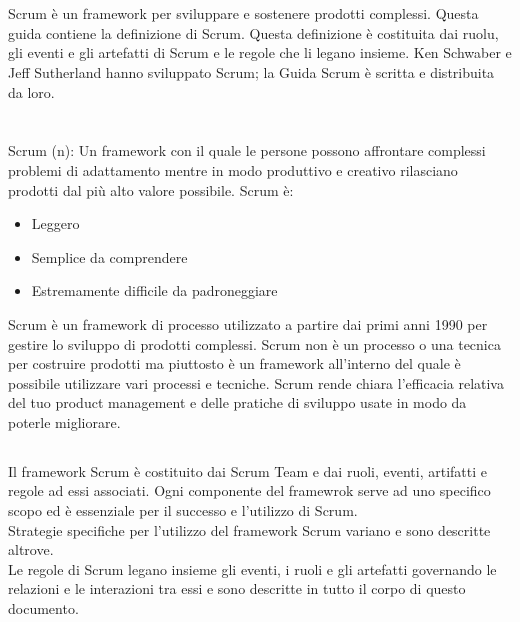 
\section*{\color{Blue}{Scopo della Guida Scrum}}
\label{sec:purpose}
Scrum \`e un framework per sviluppare e sostenere prodotti complessi. Questa guida contiene la definizione di Scrum. Questa definizione \`e 
costituita dai ruolu, gli eventi e gli artefatti di Scrum e le regole che li legano insieme. Ken Schwaber e Jeff Sutherland hanno sviluppato 
Scrum; la Guida Scrum \`e scritta e distribuita da loro.

\section*{\color{Blue}{Overview di Scrum}}
\label{sec:overview}
Scrum (n): Un framework con il quale le persone possono affrontare complessi problemi di adattamento mentre in modo produttivo e creativo rilasciano prodotti dal pi\`u alto valore possibile. Scrum \`e:

\begin{itemize}
\item Leggero
\item Semplice da comprendere
\item Estremamente difficile da padroneggiare
\end{itemize}

Scrum \`e un framework di processo utilizzato a partire dai primi anni 1990 per gestire lo sviluppo di prodotti complessi. Scrum non \`e un 
processo o una tecnica per costruire prodotti ma piuttosto è un framework all'interno del quale \`e possibile utilizzare vari processi e 
tecniche. Scrum rende chiara l'efficacia relativa del tuo product management e delle pratiche di sviluppo usate in modo da poterle 
migliorare.

\subsection*{\color{SteelBlue}{Scrum Framework}}
\label{sec:framework}
Il framework Scrum \`e costituito dai Scrum Team e dai ruoli, eventi, artifatti e regole ad essi associati. Ogni componente del framewrok 
serve ad uno specifico scopo ed \`e essenziale per il successo e l'utilizzo di Scrum.
\newline
\\Strategie specifiche per l'utilizzo del framework Scrum variano e sono descritte altrove.
\newline
\\ Le regole di Scrum legano insieme gli eventi, i ruoli e gli artefatti governando le relazioni e le interazioni tra essi e sono descritte 
in tutto il corpo di questo documento.
